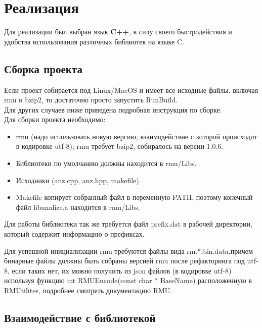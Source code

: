 \chapter{Реализация} \label{chapt4}
Для реализации был выбран язык \textbf{C++}, в силу своего быстродействия и удобства использования различных библиотек на языке C.

\section{Сборка проекта} \label{sect4_1}

\noindent Если проект собирается под Linux/MacOS и имеет все исходные файлы, включая rmu и bzip2, то достаточно просто запустить RunBuild. \\ Для других случаев ниже приведена подробная инструкция по сборке. \\

\noindent Для сборки проекта необходимо:
\begin{itemize}
  \item rmu (надо использовать новую версию, взаимодействие с которой происходит в кодировке utf-8); rmu требует bzip2, собиралось на версии 1.0.6.
  \item Библиотеки по умолчанию должны находится в rmu/Libs.
  \item Исходники (anz.cpp, anz.hpp, makefile).
  \item Makefile копирует собранный файл в переменную PATH, поэтому конечный файл libanalize.a находится в rmu/Libs.
\end{itemize}

\noindent Для работы библиотеки так же требуется файл prefix.dat в рабочей директории, который содержит информацию о префиксах.

\noindent Для успешной инициализации rmu требуются файлы вида rm.*.bin.data,причем бинарные файлы должны быть собраны версией rmu после рефакторинга под utf-8, если таких нет, их можно получить из json файлов (в кодировке utf-8) используя функцию int RMUEncode(const char * BaseName) расположенную в  RMUtilites, подробнее смотреть документацию RMU.

\section{Взаимодействие с библиотекой} \label{sect4_2}

